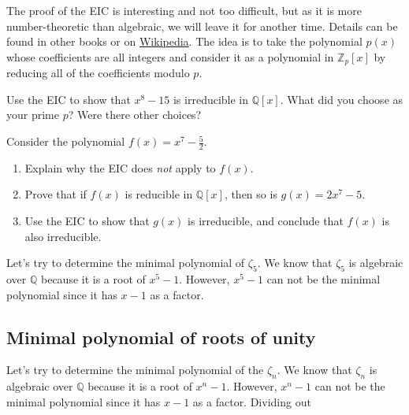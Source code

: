 The proof of the EIC is  interesting and not too difficult, but as it is more  number-theoretic than algebraic, we will leave it for another time. Details can be found in other books or on \href{https://en.wikipedia.org/wiki/Eisenstein\%27s_criterion}{Wikipedia}. The idea is to take the polynomial $p(x)$ whose coefficients are all integers and consider it as a polynomial in $\mathbb{Z}_p[x]$ by reducing all of the coefficients modulo $p$. 

\begin{problem}
Use the EIC to show that $x^{8}-15$ is irreducible in $\mathbb{Q}[x]$. What did you choose as your prime $p$? Were there other choices?
\end{problem}

\begin{problem}
Consider the polynomial $ f(x) = x^7 - \frac{5}{2}$.
\begin{enumerate}
\item Explain why the EIC does \emph{not} apply to $f(x)$.
\item Prove that if $f(x)$ is reducible in $\mathbb{Q}[x]$, then so is $g(x) = 2x^7 - 5$.
\item Use the EIC to show that $g(x)$ is irreducible, and conclude that $f(x)$ is also irreducible.
\end{enumerate}
\end{problem}

Let's try to determine the minimal polynomial of  $\zeta_5$. We know that $\zeta_5$ is algebraic over $\mathbb{Q}$ because it is a root of $x^5-1$. However, $x^5-1$ can not be the minimal polynomial since it has $x-1$ as a factor. 


\subsection{Minimal polynomial of roots of unity}

Let's try to determine the minimal polynomial of the $\zeta_n$. We know that $\zeta_n$ is algebraic over $\mathbb{Q}$ because it is a root of $x^n-1$. However, $x^n-1$ can not be the minimal polynomial since it has $x-1$ as a factor. Dividing out 




